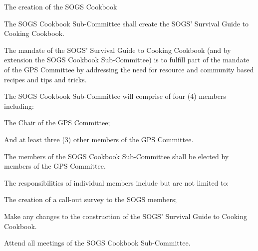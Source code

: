 \begin{longenum}[ label*=\thesubsection.\arabic*., align=left]
\begin{longenum}[label*=\arabic*., align=left]
\begin{longenum}[label*=\arabic*., align=left]
		\end{longenum}				
	\end{longenum}
\item The creation of the SOGS Cookbook
	\begin{longenum}[label*=\arabic*., align=left]
	\item The SOGS Cookbook Sub-Committee shall create the SOGS' Survival Guide to Cooking Cookbook.
	\item The mandate of the SOGS' Survival Guide to Cooking Cookbook (and by extension the SOGS Cookbook Sub-Committee) is to fulfill part of the mandate of the GPS Committee by addressing the need for resource and community based recipes and tips and tricks.
	\item The SOGS Cookbook Sub-Committee will comprise of four (4) members including:
		\begin{longenum}[label*=\arabic*., align=left]		
		\item The Chair of the GPS Committee;
		\item And at least three (3) other members of the GPS Committee.
		\end{longenum}		
	\item The members of the SOGS Cookbook Sub-Committee shall be elected by members of the GPS Committee.
	\item The responsibilities of individual members include but are not limited to:
		\begin{longenum}[label*=\arabic*., align=left]	
		\item The creation of a call-out survey to the SOGS members;
		\item Make any changes to the construction of the SOGS' Survival Guide to Cooking Cookbook.
		\item Attend all meetings of the SOGS Cookbook Sub-Committee.							
		\end{longenum}		
	\end{longenum}
\end{longenum}





















